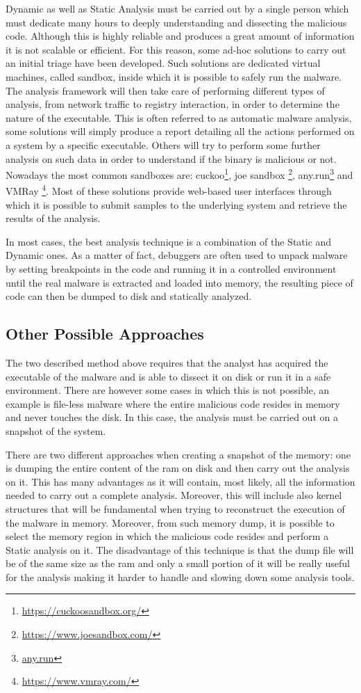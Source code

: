 \medskip
Dynamic as well as Static Analysis must be carried out by a single person which must dedicate many hours to deeply understanding and dissecting the malicious code. Although this is highly reliable and produces a great amount of information it is not scalable or efficient. For this reason, some ad-hoc solutions to carry out an initial triage have been developed. Such solutions are dedicated virtual machines, called sandbox, inside which it is possible to safely run the malware. The analysis framework will then take care of performing different types of analysis, from network traffic to registry interaction, in order to determine the nature of the executable. This is often referred to as automatic malware analysis, some solutions will simply produce a report detailing all the actions performed on a system by a specific executable. Others will try to perform some further analysis on such data in order to understand if the binary is malicious or not. Nowadays the most common sandboxes are: cuckoo\footnote{\url{https://cuckoosandbox.org/}}, joe sandbox \footnote{\url{https://www.joesandbox.com/}}, any.run\footnote{\url{any.run}} and VMRay \footnote{\url{https://www.vmray.com/}}. Most of these solutions provide web-based user interfaces through which it is possible to submit samples to the underlying system and retrieve the results of the analysis. 

In most cases, the best analysis technique is a combination of the Static and Dynamic ones. As a matter of fact, debuggers are often used to unpack malware by setting breakpoints in the code and running it in a controlled environment until the real malware is extracted and loaded into memory, the resulting piece of code can then be dumped to disk and statically analyzed.


\subsection*{Other Possible Approaches}

The two described method above requires that the analyst has acquired the executable of the malware and is able to dissect it on disk or run it in a safe environment. There are however some cases in which this is not possible, an example is file-less malware where the entire malicious code resides in memory and never touches the disk. In this case, the analysis must be carried out on a snapshot of the system. 

There are two different approaches when creating a snapshot of the memory: one is dumping the entire content of the ram on disk and then carry out the analysis on it. This has many advantages as it will contain, most likely, all the information needed to carry out a complete analysis. Moreover, this will include also kernel structures that will be fundamental when trying to reconstruct the execution of the malware in memory. Moreover, from such memory dump, it is possible to select the memory region in which the malicious code resides and perform a Static analysis on it. The disadvantage of this technique is that the dump file will be of the same size as the ram and only a small portion of it will be really useful for the analysis making it harder to handle and slowing down some analysis tools. 


